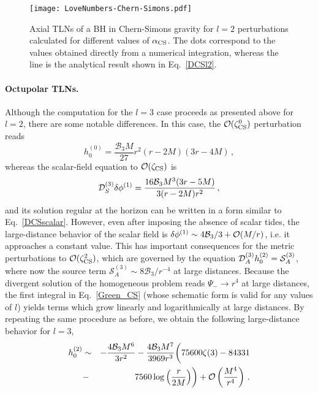 \documentclass[aps,twocolumn,showpacs,preprintnumbers,nofootinbib,prd,superscriptaddress,groupedaddress,10pt]{revtex4-1}
\def\nn{\nonumber}
\def\be{\begin{equation}}
\def\ee{\end{equation}}
\begin{document}
\begin{figure}[th]
\texttt{[image: LoveNumbers-Chern-Simons.pdf]}
\caption{Axial TLNs of a BH in Chern-Simons gravity for $l=2$ perturbations calculated for different values of $\alpha_{\rm CS}$. The dots correspond to the values obtained directly from a numerical integration, whereas the line is the analytical result shown in Eq.~\eqref{DCSl2}.}\label{fig:k2dCSalpha}
\end{figure}

\paragraph{Octupolar TLNs.}


Although the computation for the $l=3$ case proceeds as presented above for $l=2$, there are some notable differences. In this case, the ${\cal O}(\zeta_{\rm CS}^0)$ perturbation reads
%
\be
h_0^{(0)} =\frac{\mathcal{B}_3 M}{27} r^2(r-2M)  (3 r-4M)\,,
\ee
whereas the scalar-field equation to ${\cal O}(\zeta_{\rm CS})$ is
\begin{equation}
 {\cal D}_S^{(3)}\delta\phi^{(1)} =  \frac{16 \mathcal{B}_3 M^3(3r-5M)}{3 (r-2M) r^2}\,,
\end{equation}
and its solution regular at the horizon can be written in a form similar to Eq.~\eqref{DCSscalar}. However, even after imposing the absence of scalar tides, the large-distance behavior of the scalar field is $\delta\phi^{(1)}\sim 4 \mathcal{B}_3/3 +{\cal O}(M/r)$, i.e. it approaches a constant value. This has important consequences for the metric perturbations to ${\cal O}(\zeta_{\rm CS}^2)$, which are governed by the equation ${\cal D}_{A}^{(3)}{h_0^{(2)}} = \mathcal{S}_A^{(3)}$, where now the source term $\mathcal{S}_A^{(3)}\sim 8 \mathcal{B}_3/r^{-4}$ at large distances. Because the divergent solution of the homogeneous problem reads $\Psi_-\to r^4$ at large distances, the first integral in Eq.~\eqref{Green_CS} (whose schematic form is valid for any values of $l$) yields terms which grow linearly and logarithmically at large distances. By repeating the same procedure as before, we obtain the following large-distance behavior for $l=3$,
\begin{eqnarray}
h_0^{(2)} &\sim& -\frac{4 \mathcal{B}_3M^6}{3 r^2}-\frac{4\mathcal{B}_3M^7}{3969 r^3} \biggl(75600 \zeta (3)-84331 \nn\\
%
&-&7560  \log\left(\frac{r}{2M}\right)\biggr)+{\cal O}\left(\frac{M^4}{r^4}\right)\,.
\end{eqnarray}
\end{document}

